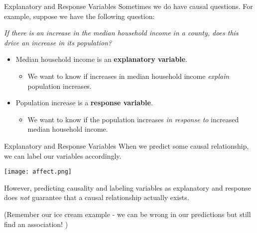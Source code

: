 \begin{frame}{Explanatory and Response Variables}
    Sometimes we do have causal questions. For example, suppose we have the following question:
    
    \begin{center}
        \textit{If there is an increase in the median household income in a county, does this drive an increase in its population?}
    \end{center}
    
    \begin{itemize}
        \item Median household income is an \textbf{explanatory variable}.
        \begin{itemize}
            \item We want to know if increases in median household income \textit{explain} population increases.
        \end{itemize}
        \item Population increase is a \textbf{response variable}.
        \begin{itemize}
            \item We want to know if the population increases \textit{in response to} increased median household income. 
        \end{itemize}
    \end{itemize} 
\end{frame}

\begin{frame}{Explanatory and Response Variables}
    When we predict some causal relationship, we can label our variables accordingly.
    
    \begin{center}
        \texttt{[image: affect.png]}
    \end{center} 
    
    However, predicting causality and labeling variables as explanatory and response does \textit{not} guarantee that a causal relationship actually exists. 
    
    \vspace{12pt}
    (Remember our ice cream example - we can be wrong in our predictions but still find an association! )

\end{frame}